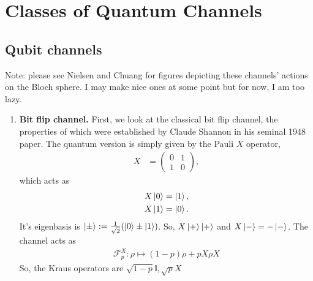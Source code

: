 \documentclass[10pt,oneside,longbibliography]{report}
\begin{document}
\chapter{Classes of Quantum Channels}
\section{Qubit channels}
Note: please see Nielsen and Chuang for figures depicting these channels' actions on the Bloch sphere. I may make nice ones at some point but for now, I am too lazy.
\begin{enumerate}
    \item \textbf{Bit flip channel.} First, we look at the classical bit flip channel, the properties of which were established by Claude Shannon in his seminal 1948 paper. The quantum version is simply given by the Pauli $X$
    operator,
    \begin{align}
        X&= \begin{pmatrix}
        0 & 1 \\
        1 & 0
        \end{pmatrix},
    \end{align}
    which acts as
    \begin{align}
        X\ket{0} &= \ket{1},\\
        X\ket{1} &= \ket{0}.
    \end{align}
    It's eigenbasis is $\ket{\pm}:=\frac{1}{\sqrt{2}}(\ket{0}\pm\ket{1})$. So, $X\ket{+} \ket{+}$ and $X\ket{-}=-\ket{-}$. The channel acts as
    \begin{align}
        \mathcal{F}_{p}^X: \rho \mapsto (1-p)\rho + p X\rho X
    \end{align}
    So, the Kraus operators are $\sqrt{1-p} \mathbb{I}, \sqrt{p} X$
    

\end{enumerate}
\end{document}
